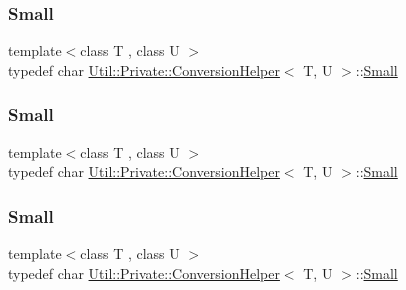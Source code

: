 \subsubsection{\texorpdfstring{Small}{Small}\hspace{0.1cm}{\footnotesize\ttfamily [1/3]}}
{\footnotesize\ttfamily template$<$class T , class U $>$ \\
typedef char \mbox{\hyperlink{structUtil_1_1Private_1_1ConversionHelper}{Util\+::\+Private\+::\+Conversion\+Helper}}$<$ T, U $>$\+::\mbox{\hyperlink{structUtil_1_1Private_1_1ConversionHelper_aaaf6583019b5246d4676b56923632385}{Small}}}

\mbox{\label{structUtil_1_1Private_1_1ConversionHelper_aaaf6583019b5246d4676b56923632385}} 
\subsubsection{\texorpdfstring{Small}{Small}\hspace{0.1cm}{\footnotesize\ttfamily [2/3]}}
{\footnotesize\ttfamily template$<$class T , class U $>$ \\
typedef char \mbox{\hyperlink{structUtil_1_1Private_1_1ConversionHelper}{Util\+::\+Private\+::\+Conversion\+Helper}}$<$ T, U $>$\+::\mbox{\hyperlink{structUtil_1_1Private_1_1ConversionHelper_aaaf6583019b5246d4676b56923632385}{Small}}}

\mbox{\label{structUtil_1_1Private_1_1ConversionHelper_aaaf6583019b5246d4676b56923632385}} 
\subsubsection{\texorpdfstring{Small}{Small}\hspace{0.1cm}{\footnotesize\ttfamily [3/3]}}
{\footnotesize\ttfamily template$<$class T , class U $>$ \\
typedef char \mbox{\hyperlink{structUtil_1_1Private_1_1ConversionHelper}{Util\+::\+Private\+::\+Conversion\+Helper}}$<$ T, U $>$\+::\mbox{\hyperlink{structUtil_1_1Private_1_1ConversionHelper_aaaf6583019b5246d4676b56923632385}{Small}}}



